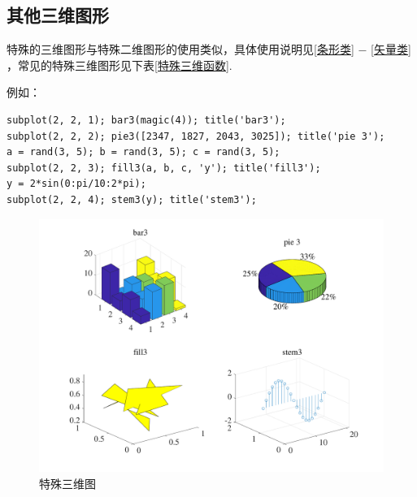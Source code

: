 \subsection{其他三维图形}
特殊的三维图形与特殊二维图形的使用类似，具体使用说明见\ref{条形类} $-$ \ref{矢量类} ，常见的特殊三维图形见下表\ref{特殊三维函数}.
\begin{table}[!htb]
	\centering
\caption{常见的特殊三维图函数}
\label{特殊三维函数}
\end{table}
例如：
\begin{lstlisting}
subplot(2, 2, 1); bar3(magic(4)); title('bar3');
subplot(2, 2, 2); pie3([2347, 1827, 2043, 3025]); title('pie 3');
a = rand(3, 5); b = rand(3, 5); c = rand(3, 5);
subplot(2, 2, 3); fill3(a, b, c, 'y'); title('fill3');
y = 2*sin(0:pi/10:2*pi);
subplot(2, 2, 4); stem3(y); title('stem3');
\end{lstlisting}
\begin{figure}[!htb]
	\centering
	\includegraphics[width=0.9\linewidth]{pic/特殊三维图.pdf}
	\vspace*{-2em}
	\caption{特殊三维图}
\end{figure}


